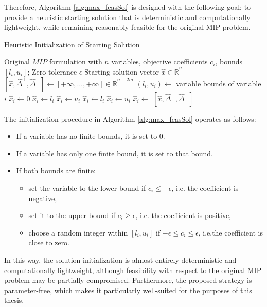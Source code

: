 Therefore, Algorithm \ref{alg:max_feasSol} is designed with the following goal: to provide a heuristic starting solution that is deterministic and computationally lightweight, while remaining reasonably feasible for the original MIP problem.  
\begin{algorithm}[H]
\caption{Heuristic Initialization of Starting Solution}\label{alg:max_feasSol}
\begin{algorithmic}[1]
\Require Original $MIP$ formulation with $n$ variables, objective coefficients $c_i$, bounds $[l_i, u_i]$; Zero-tolerance $\epsilon$
\Ensure Starting solution vector $\hat{x} \in \bar{\mathbb{R}}^n$
    \State $[\hat{x},\hat\Delta^+,\hat\Delta^-] \gets [+\infty, \ldots, +\infty] \in \bar{\mathbb{R}}^{n+2m}$
        \State $(l_i, u_i) \gets$ variable bounds of variable $i$
            \State $\hat{x}_i \gets 0$
            \State $\hat{x}_i \gets l_i$
            \State $\hat{x}_i \gets u_i$
        \Else
                \State $\hat{x}_i \gets l_i$
                \State $\hat{x}_i \gets u_i$
            \Else
                \State $\hat{x}_i \gets$ 
            \EndIf
        \EndIf
    \EndFor
    \State \Return $[\hat{x},\hat\Delta^+,\hat\Delta^-]$
\EndFunction
\end{algorithmic}
\end{algorithm}
The initialization procedure in Algorithm \ref{alg:max_feasSol} operates as follows:
\begin{itemize}
    \item If a variable has no finite bounds, it is set to $0$.
    \item If a variable has only one finite bound, it is set to that bound.
    \item If both bounds are finite:
    \begin{itemize}
        \item set the variable to the lower bound if $c_i \leq -\epsilon$, i.e. the coefficient is negative,
        \item set it to the upper bound if $c_i \geq \epsilon$, i.e. the coefficient is positive,
        \item choose a random integer within $[l_i, u_i]$ if $-\epsilon \leq c_i \leq \epsilon$, i.e.the coefficient is close to zero.
    \end{itemize}
\end{itemize}
In this way, the solution initialization is almost entirely deterministic and computationally lightweight, although feasibility with respect to the original MIP problem may be partially compromised. Furthermore, the proposed strategy is parameter-free, which makes it particularly well-suited for the purposes of this thesis.

